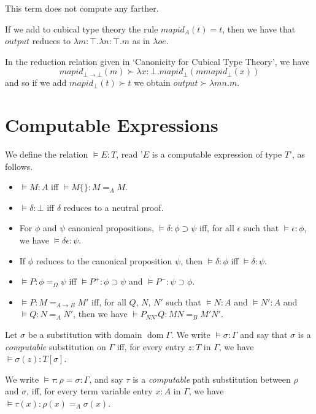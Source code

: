 \documentclass[a4paper,UKenglish]{lipics-v2016}
\newcommand*{\dom}{\ensuremath{\operatorname{dom}}}
\theoremstyle{plain}
\begin{document}
This term does not compute any farther.

If we add to cubical type theory the rule $mapid_A(t) = t$, then we have that $output$ reduces to $\lambda m : \top. \lambda n : \top. m$ as in $\lambda o e$.

In the reduction relation given in `Canonicity for Cubical Type Theory', we have
\[ mapid_{\bot \rightarrow \bot}(m) \succ \lambda x : \bot. mapid_\bot(m mapid_\bot(x)) \]
and so if we add $mapid_\bot(t) \succ t$ we obtain $output \succ \lambda mn.m$.

\section{Computable Expressions}

\begin{definition}
We define the relation $\models E : T$, read '$E$ is a computable expression of type $T$', as follows.
\begin{itemize}
\item
$\models M : A$ iff $\models M \{\} : M =_A M$.
\item
$\models \delta : \bot$ iff $\delta$ reduces to a neutral proof.
\item
For $\phi$ and $\psi$ canonical propositions, $\models \delta : \phi \supset \psi$ iff, for all $\epsilon$ such that $\models \epsilon : \phi$, we have $\models \delta \epsilon : \psi$.
\item
If $\phi$ reduces to the canonical proposition $\psi$, then $\models \delta : \phi$ iff $\models \delta : \psi$.
\item
$\models P : \phi =_\Omega \psi$ iff $\models P^+ : \phi \supset \psi$ and $\models P^- : \psi \supset \phi$.
\item
$\models P : M =_{A \rightarrow B} M'$ iff, for all $Q$, $N$, $N'$ such that $\models N : A$ and $\models N' : A$ and $\models Q : N =_A N'$, then we have $\models P_{NN'}Q : MN =_B M'N'$.
\end{itemize}
\end{definition}

\begin{definition}
Let $\sigma$ be a substitution with domain $\dom \Gamma$.  We write $\models \sigma : \Gamma$ and say that
$\sigma$ is a \emph{computable} substitution on $\Gamma$ iff, for every entry $z : T$ in $\Gamma$, we have $\models \sigma(z) : T [ \sigma ]$.

We write $\models \tau : \rho = \sigma : \Gamma $, and say $\tau$ is a \emph{computable} path substitution between $\rho$ and $\sigma$, iff, for every term variable entry $x : A$ in $\Gamma$, we have $\models \tau(x) : \rho(x) =_A \sigma(x)$.
\end{definition}
\end{document}
